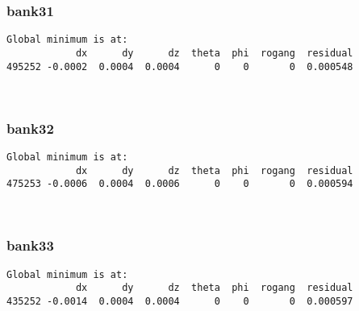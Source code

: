 \documentclass[11pt]{article}
\begin{document}
    \hypertarget{bank31}{%
\subsubsection{bank31}\label{bank31}}

    \begin{Verbatim}[commandchars=\\\{\}]
Global minimum is at:
            dx      dy      dz  theta  phi  rogang  residual
495252 -0.0002  0.0004  0.0004      0    0       0  0.000548
    \end{Verbatim}

    \begin{center}
    \end{center}
    { \hspace*{\fill} \\}
    
    \hypertarget{bank32}{%
\subsubsection{bank32}\label{bank32}}

    \begin{Verbatim}[commandchars=\\\{\}]
Global minimum is at:
            dx      dy      dz  theta  phi  rogang  residual
475253 -0.0006  0.0004  0.0006      0    0       0  0.000594
    \end{Verbatim}

    \begin{center}
    \end{center}
    { \hspace*{\fill} \\}
    
    \hypertarget{bank33}{%
\subsubsection{bank33}\label{bank33}}

    \begin{Verbatim}[commandchars=\\\{\}]
Global minimum is at:
            dx      dy      dz  theta  phi  rogang  residual
435252 -0.0014  0.0004  0.0004      0    0       0  0.000597
    \end{Verbatim}
\end{document}
